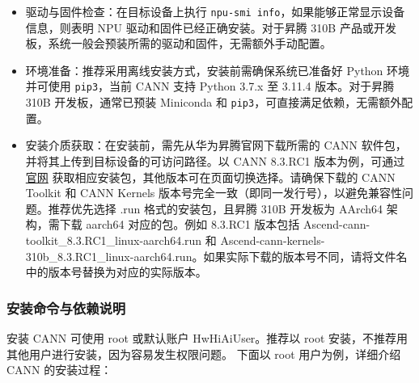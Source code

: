 \begin{itemize}
\item
  驱动与固件检查：在目标设备上执行
  \passthrough{\lstinline!npu-smi info!}，如果能够正常显示设备信息，则表明
  NPU 驱动和固件已经正确安装。对于昇腾 310B
  产品或开发板，系统一般会预装所需的驱动和固件，无需额外手动配置。
\item
  环境准备：推荐采用离线安装方式，安装前需确保系统已准备好 Python
  环境并可使用 \passthrough{\lstinline!pip3!}，当前 CANN 支持 Python
  3.7.x 至 3.11.4 版本。对于昇腾 310B 开发板，通常已预装 Miniconda 和
  \passthrough{\lstinline!pip3!}，可直接满足依赖，无需额外配置。
\item
  安装介质获取：在安装前，需先从华为昇腾官网下载所需的 CANN
  软件包，并将其上传到目标设备的可访问路径。以 CANN 8.3.RC1
  版本为例，可通过\href{https://www.hiascend.com/developer/download/community/result?module=cann&cann=8.3.RC1}{官网}
  获取相应安装包，其他版本可在页面切换选择。请确保下载的 CANN Toolkit 和
  CANN Kernels
  版本号完全一致（即同一发行号），以避免兼容性问题。推荐优先选择 .run
  格式的安装包，且昇腾 310B 开发板为 AArch64 架构，需下载 aarch64
  对应的包。例如 8.3.RC1 版本包括
  Ascend-cann-toolkit\_8.3.RC1\_linux-aarch64.run 和
  Ascend-cann-kernels-310b\_8.3.RC1\_linux-aarch64.run。如果实际下载的版本号不同，请将文件名中的版本号替换为对应的实际版本。
\end{itemize}

\subsubsection{安装命令与依赖说明}\label{src-book-chapter2-h7}

安装 CANN 可使用 root 或默认账户 HwHiAiUser。推荐以 root
安装，不推荐用其他用户进行安装，因为容易发生权限问题。 下面以 root
用户为例，详细介绍 CANN 的安装过程：

